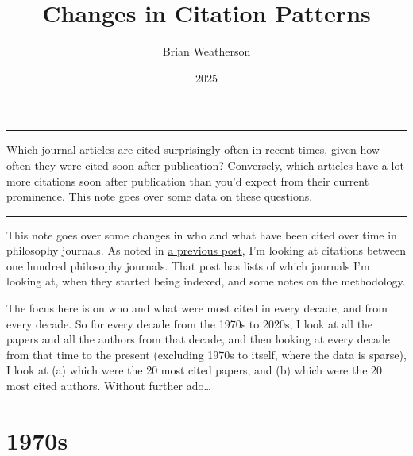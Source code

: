 \documentclass[
  10pt,
  letterpaper,
  DIV=11,
  numbers=noendperiod,
  twoside]{scrartcl}
\title{Changes in Citation Patterns}
\author{Brian Weatherson}
\date{2025}
\renewenvironment{abstract}
 {\vspace{-1.25cm}
 \quotation\small\noindent\rule{\linewidth}{.5pt}\par\smallskip
 \noindent }
 {\par\noindent\rule{\linewidth}{.5pt}\endquotation}
\begin{document}
\maketitle
\begin{abstract}
Which journal articles are cited surprisingly often in recent times,
given how often they were cited soon after publication? Conversely,
which articles have a lot more citations soon after publication than
you'd expect from their current prominence. This note goes over some
data on these questions.
\end{abstract}


This note goes over some changes in who and what have been cited over
time in philosophy journals. As noted in
\href{https://brian.weatherson.org/quarto/posts/citations-raw-data/citations.html}{a
previous post}, I'm looking at citations between one hundred philosophy
journals. That post has lists of which journals I'm looking at, when
they started being indexed, and some notes on the methodology.

The focus here is on who and what were most cited in every decade, and
from every decade. So for every decade from the 1970s to 2020s, I look
at all the papers and all the authors from that decade, and then looking
at every decade from that time to the present (excluding 1970s to
itself, where the data is sparse), I look at (a) which were the 20 most
cited papers, and (b) which were the 20 most cited authors. Without
further ado\ldots{}

\section{1970s}\label{s}
\end{document}
